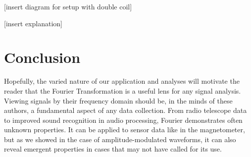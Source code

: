 \documentclass[prl,twocolumn,superscriptaddress,floatfix]{revtex4}
\begin{document}
[insert diagram for setup with double coil]

[insert explanation]
\section{Conclusion}
Hopefully, the varied nature of our application and analyses will motivate the reader that the Fourier Transformation is a useful lens for any signal analysis.
Viewing signals by their frequency domain should be, in the minds of these authors, a fundamental aspect of any data collection.
From radio telescope data to improved sound recognition in audio processing, Fourier demonstrates often unknown properties.
It can be applied to sensor data like in the magnetometer, but as we showed in the case of amplitude-modulated waveforms, it can also reveal emergent properties in cases that may not have called for its use.


\nocite{Butz2015}

\end{document}
